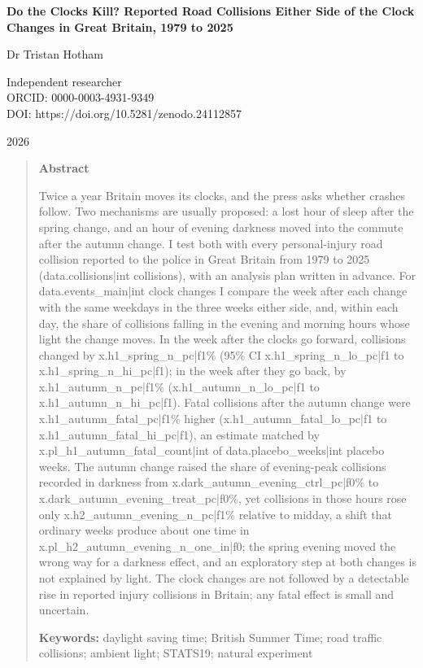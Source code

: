 \documentclass[11pt,a4paper]{article}
\begin{document}
\begin{center}
{\Large\bfseries Do the Clocks Kill? Reported Road Collisions Either Side of the Clock Changes in Great Britain, 1979 to 2025\par}
\vspace{1.2em}
{\large Dr Tristan Hotham\par}
\vspace{0.3em}
{\small Independent researcher\\
ORCID: 0000-0003-4931-9349\\
DOI: https://doi.org/10.5281/zenodo.24112857\par}
\vspace{0.8em}
2026
\end{center}

\begin{quote}
\small
\begin{center}\textbf{Abstract}\end{center}
Twice a year Britain moves its clocks, and the press asks whether crashes follow. Two mechanisms are usually proposed: a lost hour of sleep after the spring change, and an hour of evening darkness moved into the commute after the autumn change. I test both with every personal-injury road collision reported to the police in Great Britain from 1979 to 2025 ({{data.collisions|int}} collisions), with an analysis plan written in advance. For {{data.events_main|int}} clock changes I compare the week after each change with the same weekdays in the three weeks either side, and, within each day, the share of collisions falling in the evening and morning hours whose light the change moves. In the week after the clocks go forward, collisions changed by {{x.h1_spring_n_pc|f1}}\% (95\% CI {{x.h1_spring_n_lo_pc|f1}} to {{x.h1_spring_n_hi_pc|f1}}); in the week after they go back, by {{x.h1_autumn_n_pc|f1}}\% ({{x.h1_autumn_n_lo_pc|f1}} to {{x.h1_autumn_n_hi_pc|f1}}). Fatal collisions after the autumn change were {{x.h1_autumn_fatal_pc|f1}}\% higher ({{x.h1_autumn_fatal_lo_pc|f1}} to {{x.h1_autumn_fatal_hi_pc|f1}}), an estimate matched by {{x.pl_h1_autumn_fatal_count|int}} of {{data.placebo_weeks|int}} placebo weeks. The autumn change raised the share of evening-peak collisions recorded in darkness from {{x.dark_autumn_evening_ctrl_pc|f0}}\% to {{x.dark_autumn_evening_treat_pc|f0}}\%, yet collisions in those hours rose only {{x.h2_autumn_evening_n_pc|f1}}\% relative to midday, a shift that ordinary weeks produce about one time in {{x.pl_h2_autumn_evening_n_one_in|f0}}; the spring evening moved the wrong way for a darkness effect, and an exploratory step at both changes is not explained by light. The clock changes are not followed by a detectable rise in reported injury collisions in Britain; any fatal effect is small and uncertain.

\textbf{Keywords:} daylight saving time; British Summer Time; road traffic collisions; ambient light; STATS19; natural experiment
\end{quote}
\end{document}
